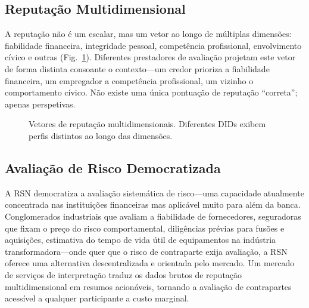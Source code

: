 \documentclass[11pt,a4paper,twocolumn]{article}
\begin{document}
\subsection{Reputação Multidimensional}

A reputação não é um escalar, mas um vetor ao longo de múltiplas dimensões: fiabilidade financeira, integridade pessoal, competência profissional, envolvimento cívico e outras (Fig.~\ref{fig:reputation-radar}). Diferentes prestadores de avaliação projetam este vetor de forma distinta consoante o contexto---um credor prioriza a fiabilidade financeira, um empregador a competência profissional, um vizinho o comportamento cívico. Não existe uma única pontuação de reputação ``correta''; apenas perspetivas.

\begin{figure}[ht]
\centering
{}
\caption{Vetores de reputação multidimensionais. Diferentes DIDs exibem perfis distintos ao longo das dimensões.}
\label{fig:reputation-radar}
\end{figure}

\subsection{Avaliação de Risco Democratizada}

A RSN democratiza a avaliação sistemática de risco---uma capacidade atualmente concentrada nas instituições financeiras mas aplicável muito para além da banca. Conglomerados industriais que avaliam a fiabilidade de fornecedores, seguradoras que fixam o preço do risco comportamental, diligências prévias para fusões e aquisições, estimativa do tempo de vida útil de equipamentos na indústria transformadora---onde quer que o risco de contraparte exija avaliação, a RSN oferece uma alternativa descentralizada e orientada pelo mercado. Um mercado de serviços de interpretação traduz os dados brutos de reputação multidimensional em resumos acionáveis, tornando a avaliação de contrapartes acessível a qualquer participante a custo marginal.
\end{document}
